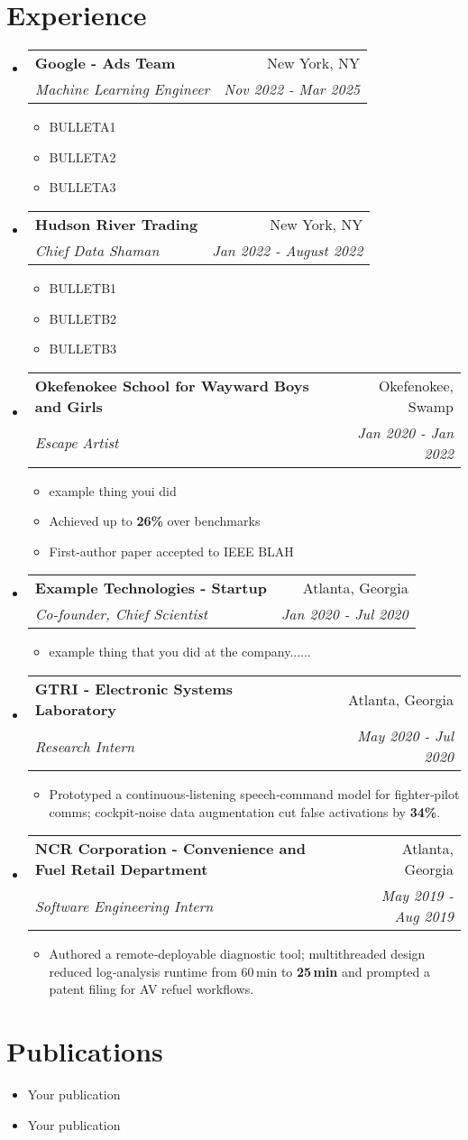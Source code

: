\documentclass[a4paper,20pt]{article}
\makeatletter
\newcommand{\resumeItem}[2]{
  \item\small{
    \textbf{#1}{#2 \vspace{-2pt}}
  }
}
\newcommand{\resumeSubheading}[4]{
  \vspace{-1pt}\item
    \begin{tabular*}{0.97\textwidth}{l@{\extracolsep{\fill}}r}
      \textbf{#1} & #2 \\
      \textit{#3} & \textit{#4} \\
    \end{tabular*}\vspace{-5pt}
}
\newcommand{\resumeSubHeadingListStart}{\begin{itemize}[label={}, leftmargin=5.0mm]}
\newcommand{\resumeSubHeadingListEnd}{\end{itemize}}
\newcommand{\resumeItemListStart}{\begin{itemize}}
\newcommand{\resumeItemListEnd}{\end{itemize}\vspace{-5pt}}
\makeatother
\begin{document}
\section{Experience}
  \resumeSubHeadingListStart
    \resumeSubheading{Google - Ads Team}{New York, NY}
    {Machine Learning Engineer}{Nov 2022 - Mar 2025}
    \resumeItemListStart
        \resumeItem{}
          {BULLETA1}
          \resumeItem{}
          {BULLETA2}
          \resumeItem{}
          {BULLETA3}
      \resumeItemListEnd
    \vspace{-3pt}
    \resumeSubheading{Hudson River Trading}{New York, NY}
    {Chief Data Shaman}{Jan 2022 - August 2022}
    \resumeItemListStart
        \resumeItem{}
          {BULLETB1}
        \resumeItem{}
          {BULLETB2}
        \resumeItem{}
          {BULLETB3}
      \resumeItemListEnd
  \resumeSubheading{Okefenokee School for Wayward Boys and Girls}{Okefenokee, Swamp}
    {Escape Artist}{Jan 2020 -  Jan 2022}
    \resumeItemListStart
        \resumeItem{}
            {example thing youi did}
            \resumeItem{}
            {Achieved up to \textbf{26\%} over benchmarks}
            \resumeItem{}
            {First‑author paper accepted to IEEE BLAH}
    \resumeItemListEnd
\resumeSubheading
		{Example Technologies - Startup}{Atlanta, Georgia}
		{Co-founder, Chief Scientist}{Jan 2020 -  Jul 2020}
		\resumeItemListStart
		\resumeItem{}
            {example thing that you did at the company......}
		\resumeItemListEnd
\vspace{-2pt}
    \resumeSubheading
		{GTRI - Electronic Systems Laboratory}{Atlanta, Georgia}
		{Research Intern}{May 2020 -  Jul 2020}
		\resumeItemListStart
        \resumeItem{}
            {Prototyped a continuous‑listening speech‑command model for fighter‑pilot comms; cockpit‑noise data augmentation cut false activations by \textbf{34\%}.}
		\resumeItemListEnd
\vspace{-1pt}
    \resumeSubheading
		{NCR Corporation - Convenience and Fuel Retail Department}{Atlanta, Georgia}
		{Software Engineering Intern}{May 2019 -  Aug 2019}
		\resumeItemListStart
        \resumeItem{}
            {Authored a remote‑deployable diagnostic tool; multithreaded design reduced log‑analysis runtime from 60\,min to \textbf{25\,min} and prompted a patent filing for AV refuel workflows.}
		\resumeItemListEnd	
\resumeSubHeadingListEnd

\vspace{-9pt}
\section{Publications}
\begin{itemize}
    \item Your publication
    \item Your publication
\end{itemize}
\end{document}
